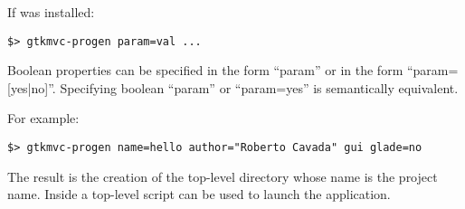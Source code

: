 If \pygtkmvc was installed:
\begin{verbatim}
$> gtkmvc-progen param=val ...
\end{verbatim}

Boolean properties can be specified in the form ``param'' or in the
form ``param=[yes|no]''. Specifying boolean ``param'' or
``param=yes'' is semantically equivalent.

For example:
\begin{verbatim}
$> gtkmvc-progen name=hello author="Roberto Cavada" gui glade=no
\end{verbatim}

The result is the creation of the top-level directory whose name is
the project name. Inside a top-level script can be used to launch
the application. 
